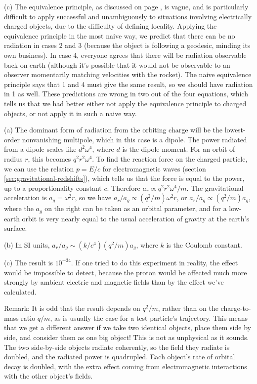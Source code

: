 (c) The equivalence principle, as discussed on page \pageref{sec:chiao-paradox},
is vague, and is particularly difficult to apply successful and unambiguously to
situations involving electrically charged objects, due to the difficulty of
defining locality. Applying the equivalence principle in the most naive way,
we predict that there can be no radiation in cases 2 and 3 (because the object is
following a geodesic, minding its own business).
In case 4, everyone agrees that there will be radiation observable back on earth
(although it's possible that it would not be observable to an observer momentarily
matching velocities with the rocket).
The naive equivalence principle says that 1 and 4 must give the same result, so
we should have radiation in 1 as well. These predictions are wrong in two out of
the four equations, which tells us that we had better either not apply the equivalence
principle to charged objects, or not apply it in such a naive way.


(a) The dominant form of radiation from the orbiting charge will be the lowest-order
nonvanishing multipole, which in this case is a dipole. The power radiated from
a dipole scales like $d^2\omega^4$, where $d$ is the dipole moment. For an orbit of
radius $r$, this becomes $q^2r^2\omega^4$. To find the reaction force on the charged particle,
we can use the relation $p=E/c$ for electromagnetic waves (section \ref{sec:gravitational-redshifts}),
which tells us that the force is equal to the power, up to a proportionality constant $c$.
Therefore $a_r\propto q^2r^2\omega^4/m$. The gravitational acceleration is $a_g=\omega^2 r$,
so we have $a_r/a_g \propto (q^2/m)\omega^2 r$, or $a_r/a_g \propto (q^2/m)a_g$, where the
$a_g$ on the right can be taken as an orbital parameter, and for a low-earth orbit is very nearly equal to
the usual acceleration of gravity at the earth's surface.

(b) In SI units, $a_r/a_g \sim (k/c^4)(q^2/m)a_g$, where $k$ is the Coulomb constant.

(c) The result is $10^{-34}$. If one tried to do this experiment in reality, the effect would be
impossible to detect, because the proton would be affected much more strongly by ambient electric and
magnetic fields than by the effect we've calculated.

Remark: It is odd that the result depends on $q^2/m$, rather than on the charge-to-mass ratio $q/m$,
as is usually the case for a test particle's trajectory. This means that we get a different answer
if we take two identical objects, place them side by side, and consider them as one big object! This is not as unphysical
as it sounds. The two side-by-side objects radiate coherently, so the field they radiate is doubled, and the
radiated power is quadrupled. Each object's rate of orbital decay is doubled, with the extra effect coming
from electromagnetic interactions with the other object's fields.

